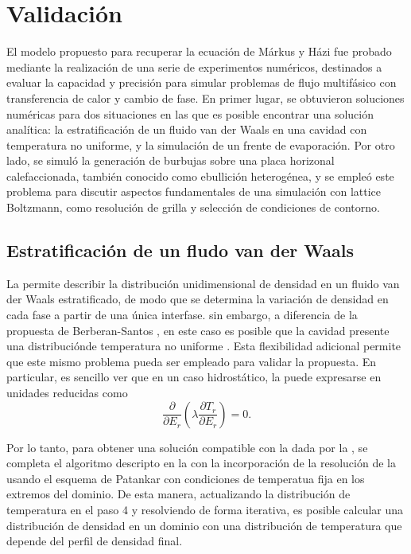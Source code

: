 \section{Validaci\'on}

El modelo propuesto para recuperar la ecuaci\'on de M\'arkus y H\'azi fue probado mediante la realizaci\'on de una serie de experimentos num\'ericos, destinados a evaluar la capacidad y precisi\'on para simular problemas de flujo multif\'asico con transferencia de calor y cambio de fase. En primer lugar, se obtuvieron soluciones num\'ericas para dos situaciones en las que es posible encontrar una soluci\'on anal\'itica: la estratificaci\'on de un fluido van der Waals en una cavidad con temperatura no uniforme, y la simulaci\'on de un frente de evaporaci\'on. Por otro lado, se simul\'o la generaci\'on de burbujas sobre una placa horizonal calefaccionada, tambi\'en conocido como ebullici\'on heterog\'enea, y se emple\'o este problema para discutir aspectos fundamentales de una simulaci\'on con lattice Boltzmann, como resoluci\'on de grilla y selecci\'on de condiciones de contorno.




\subsection{Estratificaci\'on de un fludo van der Waals}
\label{sec:vdWColumnHT}

La  permite describir la distribuci\'on unidimensional de densidad en un fluido van der Waals estratificado, de modo que se determina la variaci\'on de densidad en cada fase a partir de una \'unica interfase. sin embargo, a diferencia de la propuesta de Berberan-Santos \cite{berberan-santos_liquidvapor_2002}, en este caso es posible que la cavidad presente una distribuci\'onde temperatura no uniforme \cite{fogliatto_simulation_2019}. Esta flexibilidad adicional permite que este mismo problema pueda ser empleado para validar la \lbe{} propuesta. En particular, es sencillo ver que en un caso hidrost\'atico, la  puede expresarse en unidades reducidas como
\begin{equation}
	\dfrac{\partial}{\partial E_r} \left( \lambda \dfrac{\partial T_r}{\partial E_r} \right) = 0.
	\label{eq:markus_1d}
\end{equation}

Por lo tanto, para obtener una soluci\'on compatible con la \lbe{} dada por la , se completa el algoritmo descripto en la  con la incorporaci\'on de la resoluci\'on de la  usando el esquema de Patankar \cite{patankar_numerical_1980} con condiciones de temperatua fija en los extremos del dominio. De esta manera, actualizando la distribuci\'on de temperatura en el paso 4 y resolviendo de forma iterativa, es posible calcular una distribuci\'on de densidad en un dominio con una distribuci\'on de temperatura que depende del perfil de densidad final. 


